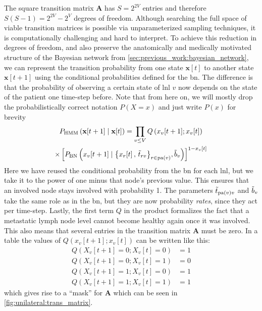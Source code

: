 \documentclass[\relativeRoot/main.tex]{subfiles}
\begin{document}
The square transition matrix $\mathbf{A}$ has $S = 2^{2V}$ entries and therefore $S(S-1)=2^{2V}-2^V$ degrees of freedom. Although searching the full space of viable transition matrices is possible via unparameterized sampling techniques, it is computationally challenging and hard to interpret. To achieve this reduction in degrees of freedom, and also preserve the anatomically and medically motivated structure of the Bayesian network from \cref{sec:previous_work:bayesian_network}, we can represent the transition probability from one state $\mathbf{x}[t]$ to another state $\mathbf{x}[t+1]$ using the conditional probabilities defined for the \gls{bn}. The difference is that the probability of observing a certain state of \gls{lnl} $v$ now depends on the state of the patient one time-step before. Note that from here on, we will mostly drop the probabilistically correct notation $P(X=x)$ and just write $P(x)$ for brevity
%
\begin{multline} \label{eq:unilateral:parametrization:one_step}
    P_\text{HMM} \left( \mathbf{x}[t+1] \mid \mathbf{x}[t] \right)
    = \prod_{v \leq V}{Q \left( x_v[t+1]; x_v[t] \right)} \\ 
    \times \left[ P_\text{BN} \left( x_v[t+1] \mid \big\{ x_r[t] \, , \, \Tilde{t}_{rv} \big\}_{r \in \operatorname{pa}(v)}, \Tilde{b}_v \right) \right]^{1-x_v[t]}
\end{multline}
%
Here we have reused the conditional probability from the \gls{bn} for each \gls{lnl}, but we take it to the power of one minus that node's previous value. This ensures that an involved node stays involved with probability 1. The parameters $\Tilde{t}_{\operatorname{pa}(v)v}$ and $\Tilde{b}_v$ take the same role as in the \gls{bn}, but they are now probability \emph{rates}, since they act per time-step. Lastly, the first term $Q$ in the product formalizes the fact that a metastatic lymph node level cannot become healthy again once it was involved. This also means that several entries in the transition matrix $\mathbf{A}$ must be zero. In a table the values of $Q\left( x_v[t+1]; x_v[t] \right)$ can be written like this:
%
\begin{equation}
    \begin{aligned}
        Q \left( X_v[t+1] = 0; X_v[t] = 0 \right) &= 1 \\
        Q \left( X_v[t+1] = 0; X_v[t] = 1 \right) &= 0 \\
        Q \left( X_v[t+1] = 1; X_v[t] = 0 \right) &= 1 \\
        Q \left( X_v[t+1] = 1; X_v[t] = 1 \right) &= 1 
    \end{aligned}
\end{equation}
%
which gives rise to a ``mask'' for $\mathbf{A}$ which can be seen in \cref{fig:unilateral:trans_matrix}.
\end{document}
